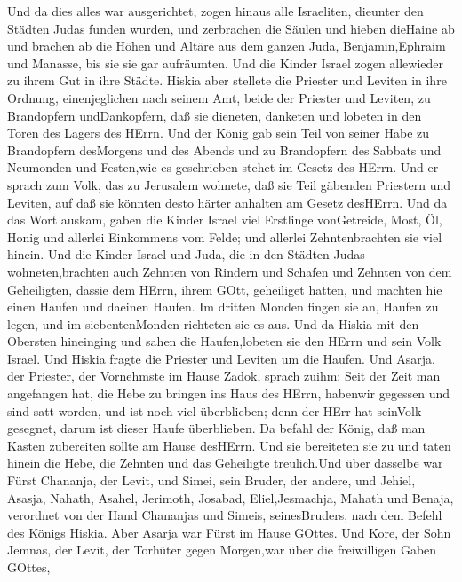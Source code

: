  Und da dies alles war ausgerichtet, zogen hinaus alle
Israeliten, dieunter den Städten Judas funden wurden, und zerbrachen die
Säulen und hieben dieHaine ab und brachen ab die Höhen und Altäre aus
dem ganzen Juda, Benjamin,Ephraim und Manasse, bis sie sie gar
aufräumten. Und die Kinder Israel zogen allewieder zu ihrem Gut in ihre
Städte.  Hiskia aber stellete die Priester und Leviten in
ihre Ordnung, einenjeglichen nach seinem Amt, beide der Priester und
Leviten, zu Brandopfern undDankopfern, daß sie dieneten, danketen und
lobeten in den Toren des Lagers des HErrn.  Und der König
gab sein Teil von seiner Habe zu Brandopfern desMorgens und des Abends
und zu Brandopfern des Sabbats und Neumonden und Festen,wie es
geschrieben stehet im Gesetz des HErrn.  Und er sprach zum
Volk, das zu Jerusalem wohnete, daß sie Teil gäbenden Priestern und
Leviten, auf daß sie könnten desto härter anhalten am Gesetz desHErrn.
 Und da das Wort auskam, gaben die Kinder Israel viel
Erstlinge vonGetreide, Most, Öl, Honig und allerlei Einkommens vom
Felde; und allerlei Zehntenbrachten sie viel hinein.  Und
die Kinder Israel und Juda, die in den Städten Judas wohneten,brachten
auch Zehnten von Rindern und Schafen und Zehnten von dem Geheiligten,
dassie dem HErrn, ihrem GOtt, geheiliget hatten, und machten hie einen
Haufen und daeinen Haufen.  Im dritten Monden fingen sie an,
Haufen zu legen, und im siebentenMonden richteten sie es aus.
 Und da Hiskia mit den Obersten hineinging und sahen die
Haufen,lobeten sie den HErrn und sein Volk Israel.  Und
Hiskia fragte die Priester und Leviten um die Haufen.  Und
Asarja, der Priester, der Vornehmste im Hause Zadok, sprach zuihm: Seit
der Zeit man angefangen hat, die Hebe zu bringen ins Haus des HErrn,
habenwir gegessen und sind satt worden, und ist noch viel überblieben;
denn der HErr hat seinVolk gesegnet, darum ist dieser Haufe überblieben.
 Da befahl der König, daß man Kasten zubereiten sollte am
Hause desHErrn. Und sie bereiteten sie zu  und taten hinein
die Hebe, die Zehnten und das Geheiligte treulich.Und über dasselbe war
Fürst Chananja, der Levit, und Simei, sein Bruder, der andere,
 und Jehiel, Asasja, Nahath, Asahel, Jerimoth, Josabad,
Eliel,Jesmachja, Mahath und Benaja, verordnet von der Hand Chananjas und
Simeis, seinesBruders, nach dem Befehl des Königs Hiskia. Aber Asarja
war Fürst im Hause GOttes.  Und Kore, der Sohn Jemnas, der
Levit, der Torhüter gegen Morgen,war über die freiwilligen Gaben GOttes,
